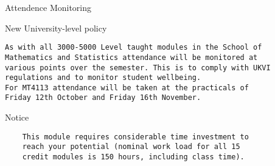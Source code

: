 \documentclass[ignorenonframetext,]{beamer}
\begin{document}
\begin{frame}[fragile]{Attendence Monitoring}

New University-level policy

\begin{verbatim}
As with all 3000-5000 Level taught modules in the School of
Mathematics and Statistics attendance will be monitored at 
various points over the semester. This is to comply with UKVI 
regulations and to monitor student wellbeing.  
For MT4113 attendance will be taken at the practicals of 
Friday 12th October and Friday 16th November.
\end{verbatim}

\end{frame}

\begin{frame}[fragile]{Notice}

\begin{verbatim}
    This module requires considerable time investment to 
    reach your potential (nominal work load for all 15 
    credit modules is 150 hours, including class time).
\end{verbatim}

\end{frame}
\end{document}
